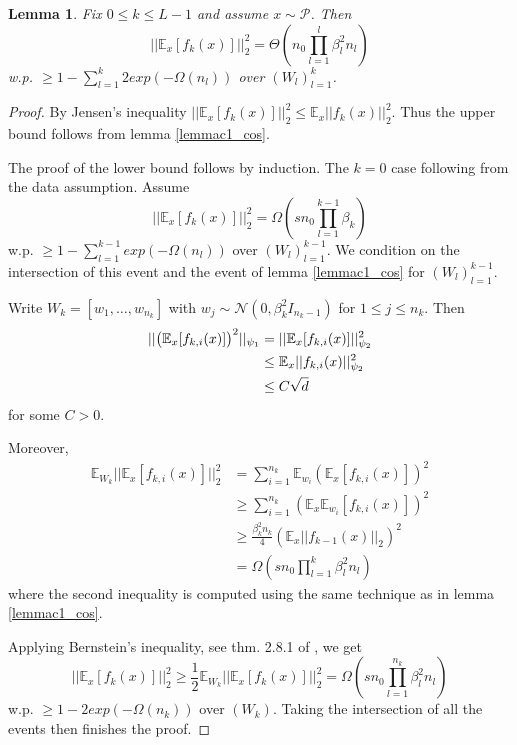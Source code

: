 \documentclass{article}
\theoremstyle{plain}
\newtheorem{lemma}[Theorem]{Lemma}
\theoremstyle{definition}
\theoremstyle{remark}
\begin{document}
\begin{lemma}\label{c.2}
Fix $0 \leq k \leq L-1$ and 
assume $x \sim \mathcal{P}$. Then 
\begin{equation*}
	\vert\vert \mathbb{E}_x[f_k(x)]\vert\vert_2^2 = 
	\Theta(n_0\prod_{l=1}^l\beta_l^2n_l)
\end{equation*}
w.p. $\geq 1 - \sum_{l=1}^k2exp(-\Omega(n_l))$ over $(W_l)_{l=1}^k$.
\end{lemma}

\begin{proof}
By Jensen's inequality 
$\vert\vert \mathbb{E}_x[f_k(x)]\vert\vert^2_2 \leq 
\mathbb{E}_x\vert\vert f_k(x)\vert\vert_2^2$. Thus the upper bound follows from
lemma \ref{lemmac1_cos}. 

The proof of the lower bound follows by induction. The $k = 0$ case following from the data assumption. Assume 
\begin{equation*}
	\vert\vert\mathbb{E}_x[f_k(x)]\vert\vert_2^2 = 
	\Omega(sn_0\prod_{l=1}^{k-1}\beta_k)
\end{equation*}
w.p. $\geq 1 - \sum_{l=1}^{k-1}exp(-\Omega(n_l))$ over $(W_l)_{l=1}^{k-1}$. We condition on the intersection of this event and the event of lemma \ref{lemmac1_cos} for $(W_l)_{l=1}^{k-1}$.

Write $W_k = [w_1,\ldots,w_{n_k}]$ with 
$w_j \sim \mathcal{N}(0, \beta_k^2I_{n_k-1})$ for $1\leq j \leq n_k$. Then
\begin{align*}
	\vert\vert \big{(} 
	\mathbb{E}_x[f_{k,i}(x)]	
	\big{)}^2\vert\vert_{\psi_1} &= 
	\vert\vert
	\mathbb{E}_x[f_{k,i}(x)]	
	\vert\vert^2_{\psi_2} \\
	&\leq 
	\mathbb{E}_x\vert\vert f_{k,i}(x)\vert\vert_{\psi_2}^2 \\
	&\leq
	C\sqrt{d}	
\end{align*}
for some $C > 0$.

Moreover, 
\begin{align*}
	\mathbb{E}_{W_k}
	\vert\vert
	\mathbb{E}_x[f_{k,i}(x)]	
	\vert\vert^2_2 &= \sum_{i=1}^{n_k}
	\mathbb{E}_{w_i}(\mathbb{E}_x[f_{k,i}(x)])^2 \\
	&\geq 
	\sum_{i=1}^{n_k}(\mathbb{E}_x\mathbb{E}_{w_i}[f_{k,i}(x)])^2 \\
	&\geq 
	\frac{\beta_k^2n_k}{4}(\mathbb{E}_x\vert\vert f_{k-1}(x)\vert\vert_2)^2 \\
	&=
	\Omega(sn_0\prod_{l=1}^{k}\beta_l^2n_l)
\end{align*}
where the second inequality is computed using the same technique as in 
lemma \ref{lemmac1_cos}.

Applying Bernstein's inequality, see thm. 2.8.1 of \cite{vershynin2018high}, we get
\begin{equation*}
	\vert\vert \mathbb{E}_x[f_k(x)]\vert\vert_2^2 \geq \frac{1}{2}
	\mathbb{E}_{W_k}\vert\vert \mathbb{E}_x[f_k(x)]\vert\vert_2^2 
	= \Omega(sn_0\prod_{l=1}^{n_k}\beta_l^2n_l)
\end{equation*}
w.p. $\geq 1 - 2exp(-\Omega(n_k))$ over $(W_k)$. Taking the intersection of all the events then finishes the proof.
\end{proof}
\end{document}
